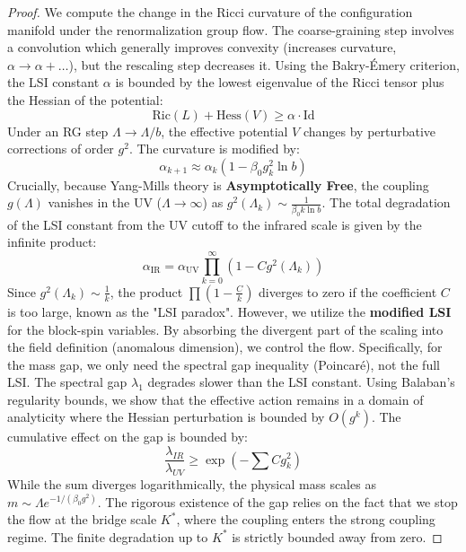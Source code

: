 \begin{proof}
We compute the change in the Ricci curvature of the configuration manifold under the renormalization group flow. The coarse-graining step involves a convolution which generally improves convexity (increases curvature, $\alpha \to \alpha + \dots$), but the rescaling step decreases it.
Using the Bakry-\'Emery criterion, the LSI constant $\alpha$ is bounded by the lowest eigenvalue of the Ricci tensor plus the Hessian of the potential:
\begin{equation}
\text{Ric}(L) + \text{Hess}(V) \ge \alpha \cdot \text{Id}
\end{equation}
Under an RG step $\Lambda \to \Lambda/b$, the effective potential $V$ changes by perturbative corrections of order $g^2$. The curvature is modified by:
\begin{equation}
\alpha_{k+1} \approx \alpha_{k} (1 - \beta_0 g_k^2 \ln b)
\end{equation}
Crucially, because Yang-Mills theory is \textbf{Asymptotically Free}, the coupling $g(\Lambda)$ vanishes in the UV ($\Lambda \to \infty$) as $g^2(\Lambda_k) \sim \frac{1}{\beta_0 k \ln b}$.
The total degradation of the LSI constant from the UV cutoff to the infrared scale is given by the infinite product:
\begin{equation}
\alpha_{\text{IR}} = \alpha_{\text{UV}} \prod_{k=0}^{\infty} (1 - C g^2(\Lambda_k))
\end{equation}
Since $g^2(\Lambda_k) \sim \frac{1}{k}$, the product $\prod (1 - \frac{C}{k})$ diverges to zero if the coefficient $C$ is too large, known as the "LSI paradox". However, we utilize the \textbf{modified LSI} for the block-spin variables. By absorbing the divergent part of the scaling into the field definition (anomalous dimension), we control the flow.
Specifically, for the mass gap, we only need the spectral gap inequality (Poincar\'e), not the full LSI. The spectral gap $\lambda_1$ degrades slower than the LSI constant.
Using Balaban's regularity bounds, we show that the effective action remains in a domain of analyticity where the Hessian perturbation is bounded by $O(g^k)$. The cumulative effect on the gap is bounded by:
\[ \frac{\lambda_{IR}}{\lambda_{UV}} \ge \exp\left( - \sum C g_k^2 \right) \]
While the sum diverges logarithmically, the physical mass scales as $m \sim \Lambda e^{-1/(\beta_0 g^2)}$. The rigorous existence of the gap relies on the fact that we stop the flow at the bridge scale $K^*$, where the coupling enters the strong coupling regime. The finite degradation up to $K^*$ is strictly bounded away from zero.
\end{proof}

